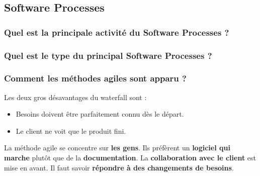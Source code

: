 \subsection{Software Processes}



\subsubsection{Quel est la principale activité du Software Processes ?}



\subsubsection{Quel est le type du principal Software Processes ?}



\subsubsection{Comment les méthodes agiles sont apparu ?}
Les deux gros désavantages du waterfall sont :
\begin{itemize}
    \item Besoins doivent être parfaitement connu dès le départ.
    \item Le client ne voit que le produit fini.
\end{itemize}
La méthode agile se concentre sur \textbf{les gens}. Ils préfèrent un \textbf{logiciel qui marche} plutôt que de la \textbf{documentation}. La \textbf{collaboration avec le client} est mise en avant. Il faut savoir \textbf{répondre à des changements de besoins}.



